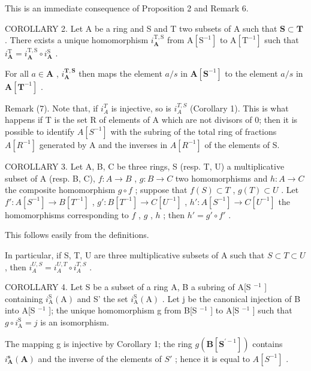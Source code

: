 This is an immediate consequence of Proposition 2 and Remark 6.

COROLLARY 2. Let A be a ring and S and T two subsets of A such that \(\mathbf{S} \subset \mathbf{T}\) . There exists a unique homomorphism \(i_{\mathbf{A}}^{\mathrm{T},\mathrm{S}}\) from \(\mathrm{A}[\mathrm{S}^{-1}]\) to \(\mathrm{A}[\mathrm{T}^{-1}]\) such that \(i_{\mathbf{A}}^{\mathrm{T}} = i_{\mathbf{A}}^{\mathrm{T},\mathrm{S}} \circ i_{\mathbf{A}}^{\mathrm{S}}\) .

For all \(a \in \mathbf{A}\) , \(i_{\mathbf{A}}^{\mathbf{T},\mathbf{S}}\) then maps the element \(a / s\) in \(\mathbf{A}[\mathbf{S}^{-1}]\) to the element \(a / s\) in \(\mathbf{A}[\mathbf{T}^{-1}]\) .

Remark (7). Note that, if \(i_{A}^{T}\) is injective, so is \(i_{A}^{T,S}\) (Corollary 1). This is what happens if T is the set R of elements of A which are not divisors of 0; then it is possible to identify \(A[S^{-1}]\) with the subring of the total ring of fractions \(A[R^{-1}]\) generated by A and the inverses in \(A[R^{-1}]\) of the elements of S.

COROLLARY 3. Let A, B, C be three rings, S (resp. T, U) a multiplicative subset of A (resp. B, C), \(f\colon A \to B\) , \(g\colon B \to C\) two homomorphisms and \(h\colon A \to C\) the composite homomorphism \(g \circ f\) ; suppose that \(f(S) \subset T\) , \(g(T) \subset U\) . Let \(f'\colon A[S^{-1}] \to B[T^{-1}]\) , \(g'\colon B[T^{-1}] \to C[U^{-1}]\) , \(h'\colon A[S^{-1}] \to C[U^{-1}]\) the homomorphisms corresponding to \(f\) , \(g\) , \(h\) ; then \(h' = g' \circ f'\) .

This follows easily from the definitions.

In particular, if S, T, U are three multiplicative subsets of A such that \(S \subset T \subset U\) , then \(i_{A}^{U,S} = i_{A}^{U,T} \circ i_{A}^{T,S}\) .

COROLLARY 4. Let S be a subset of a ring A, B a subring of A{[}S \(^{-1}\) {]} containing \(i_{\text{A}}^{\text{S}}(\text{A})\) and S' the set \(i_{\text{A}}^{\text{S}}(\text{A})\) . Let j be the canonical injection of B into A{[}S \(^{-1}\) {]}; the unique homomorphism g from B{[}S \(^{-1}\) {]} to A{[}S \(^{-1}\) {]} such that \(g \circ i_{\text{A}}^{\text{S}} = j\) is an isomorphism.

The mapping g is injective by Corollary 1; the ring \(g(\mathbf{B}[\mathbf{S}^{\prime-1}])\) contains \(i_{\mathbf{A}}^{\mathbf{s}}(\mathbf{A})\) and the inverse of the elements of \(S'\) ; hence it is equal to \(A[S^{-1}]\) .

